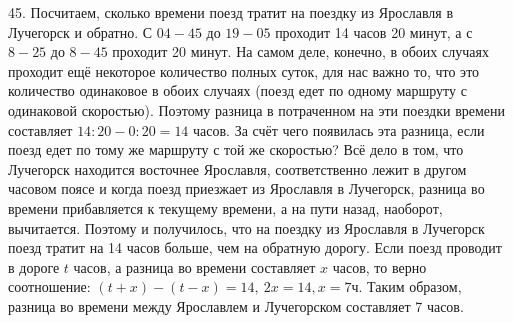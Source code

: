 45. Посчитаем, сколько времени поезд тратит на поездку из Ярославля в Лучегорск и обратно. С $04-45$ до $19-05$ проходит 14 часов 20 минут, а с $8-25$ до $8-45$ проходит 20 минут. На самом деле, конечно, в обоих случаях проходит ещё некоторое количество полных суток, для нас важно то, что это количество одинаковое в обоих случаях (поезд едет по одному маршруту с одинаковой скоростью). Поэтому разница в потраченном на эти поездки времени составляет $14:20-0:20=14$ часов. За счёт чего появилась эта разница, если поезд едет по тому же маршруту с той же скоростью? Всё дело в том, что Лучегорск находится восточнее Ярославля, соответственно лежит в другом часовом поясе и когда поезд приезжает из Ярославля в Лучегорск, разница во времени прибавляется к текущему времени, а на пути назад, наоборот, вычитается. Поэтому и получилось, что на поездку из Ярославля в Лучегорск поезд тратит на 14 часов больше, чем на обратную дорогу. Если поезд проводит в дороге $t$ часов, а разница во времени составляет $x$ часов, то верно соотношение: $(t+x)-(t-x)=14,\ 2x=14, x=7$ч. Таким образом, разница во времени между Ярославлем и Лучегорском составляет 7 часов.\\
